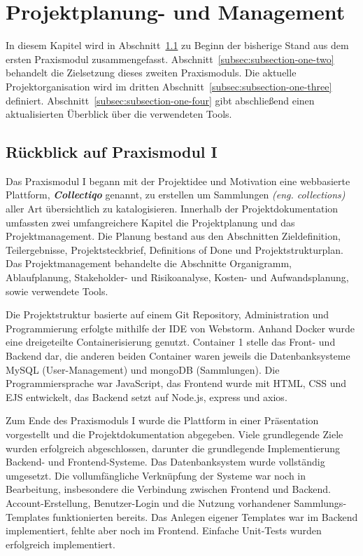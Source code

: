 \section{Projektplanung- und Management}\label{sec:section-one}

In diesem Kapitel wird in Abschnitt~\ref{subsec:subsection-one-one} zu Beginn der bisherige Stand aus dem ersten Praxismodul zusammengefasst.
Abschnitt~\ref{subsec:subsection-one-two} behandelt die Zielsetzung dieses zweiten Praxismoduls.
Die aktuelle Projektorganisation wird im dritten Abschnitt~\ref{subsec:subsection-one-three} definiert.
Abschnitt~\ref{subsec:subsection-one-four} gibt abschließend einen aktualisierten Überblick über die verwendeten Tools.

\subsection{Rückblick auf Praxismodul I}\label{subsec:subsection-one-one}

Das Praxismodul I begann mit der Projektidee und Motivation eine webbasierte Plattform, \textbf{\textit{Collectiqo}} genannt, zu erstellen um Sammlungen \textit{(eng. collections)} aller Art übersichtlich zu katalogisieren.
Innerhalb der Projektdokumentation umfassten zwei umfangreichere Kapitel die Projektplanung und das Projektmanagement.
Die Planung bestand aus den Abschnitten Zieldefinition, Teilergebnisse, Projektsteckbrief, Definitions of Done und Projektstrukturplan.
Das Projektmanagement behandelte die Abschnitte Organigramm, Ablaufplanung, Stakeholder- und Risikoanalyse, Kosten- und Aufwandsplanung, sowie verwendete Tools.

Die Projektstruktur basierte auf einem Git Repository, Administration und Programmierung erfolgte mithilfe der IDE von Webstorm.
Anhand Docker wurde eine dreigeteilte Containerisierung genutzt.
Container 1 stelle das Front- und Backend dar, die anderen beiden Container waren jeweils die Datenbanksysteme MySQL (User-Management) und mongoDB (Sammlungen).
Die Programmiersprache war JavaScript, das Frontend wurde mit HTML, CSS und EJS entwickelt, das Backend setzt auf Node.js, express und axios.

Zum Ende des Praxismoduls I wurde die Plattform in einer Präsentation vorgestellt und die Projektdokumentation abgegeben.
Viele grundlegende Ziele wurden erfolgreich abgeschlossen, darunter die grundlegende Implementierung Backend- und Frontend-Systeme.
Das Datenbanksystem wurde vollständig umgesetzt.
Die vollumfängliche Verknüpfung der Systeme war noch in Bearbeitung, insbesondere die Verbindung zwischen Frontend und Backend.
Account-Erstellung, Benutzer-Login und die Nutzung vorhandener Sammlungs-Templates funktionierten bereits.
Das Anlegen eigener Templates war im Backend implementiert, fehlte aber noch im Frontend.
Einfache Unit-Tests wurden erfolgreich implementiert.

